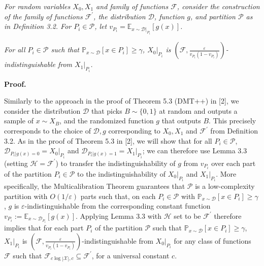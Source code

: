 \documentclass[10pt,a4paper]{article}
\begin{document}
\emph{For random variables $X_{0},X_{1}$ and family of functions $\mathcal{F}$, consider the construction of the family of functions $\mathcal{F}^{\prime}$, the distribution $\mathcal{D}$, function $g$, and partition $\mathcal{P}$ as in Definition 3.2. For $P_{i}\in\mathcal{P}$, let $v_{P_{i}}=\mathbb{E}_{x\sim\mathcal{D}|_{P_{i}}}[g(x)]$.}\par




\emph{For all $P_{i}\in\mathcal{P}$ such that $\mathbb{P}_{x\sim\mathcal{D}}[x\in P_{i}]\geq\gamma$, $X_{0}|_{P_{i}}$ is $(\mathcal{F},\frac{\varepsilon}{v_{P_{i}}(1-v_{P_{i}})})$-indistinguishable from $X_{1}|_{P_{i}}$.}\par






\par\medskip\noindent\textbf{Proof.}\par




Similarly to the approach in the proof of Theorem 5.3 (DMT++) in [2], we consider the distribution $\mathcal{D}$ that picks $B\sim\{0,1\}$ at random and outputs a sample of $x\sim X_{B}$, and the randomized function $g$ that outputs $B$. This precisely corresponds to the choice of $\mathcal{D},g$ corresponding to $X_{0},X_{1}$ and $\mathcal{F}^{\prime}$ from Definition 3.2. As in the proof of Theorem 5.3 in [2], we will show that for all $P_{i}\in\mathcal{P}$, $\mathcal{D}_{P_{i}|g(x)=0}=X_{0}|_{P_{i}}$ and $\mathcal{D}_{P_{i}|g(x)=1}=X_{1}|_{P_{i}}$; we can therefore use Lemma 3.3 (setting $\mathcal{H}=\mathcal{F}^{\prime}$) to transfer the indistinguishability of $g$ from $v_{P_{i}}$ over each part of the partition $P_{i}\in\mathcal{P}$ to the indistinguishability of $X_{0}|_{P_{i}}$ and $X_{1}|_{P_{i}}$. More specifically, the Multicalibration Theorem guarantees that $\mathcal{P}$ is a low-complexity partition with $O(1/\varepsilon)$ parts such that, on each $P_{i}\in\mathcal{P}$ with $\mathbb{P}_{x\sim\mathcal{D}}[x\in P_{i}]\geq\gamma$, $g$ is $\varepsilon$-indistinguishable from the corresponding constant function $v_{P_{i}}:=\mathbb{E}_{x\sim\mathcal{D}_{P_{i}}}[g(x)]$. Applying Lemma 3.3 with $\mathcal{H}$ set to be $\mathcal{F}^{\prime}$ therefore implies that for each part $P_{i}$ of the partition $\mathcal{P}$ such that $\mathbb{P}_{x\sim\mathcal{D}}[x\in P_{i}]\geq\gamma$, $X_{1}|_{P_{i}}$ is $(\mathcal{F},\frac{\varepsilon}{v_{P_{i}}(1-v_{P_{i}})})$-indistinguishable from $X_{0}|_{P_{i}}$ for any class of functions $\mathcal{F}$ such that $\mathcal{F}_{c\log|\mathcal{X}|,c}\subseteq\mathcal{F}^{\prime}$, for a universal constant $c$.\par
\end{document}
